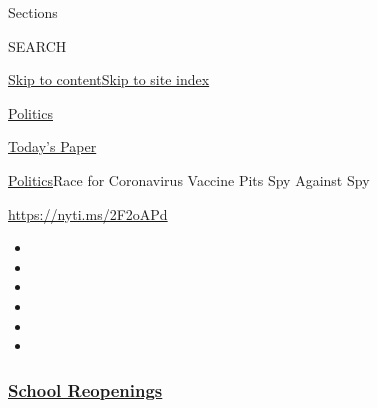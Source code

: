 Sections

SEARCH

\protect\hyperlink{site-content}{Skip to
content}\protect\hyperlink{site-index}{Skip to site index}

\href{https://www.nytimes3xbfgragh.onion/section/politics}{Politics}

\href{https://myaccount.nytimes3xbfgragh.onion/auth/login?response_type=cookie\&client_id=vi}{}

\href{https://www.nytimes3xbfgragh.onion/section/todayspaper}{Today's
Paper}

\href{/section/politics}{Politics}\textbar{}Race for Coronavirus Vaccine
Pits Spy Against Spy

\url{https://nyti.ms/2F2oAPd}

\begin{itemize}
\item
\item
\item
\item
\item
\item
\end{itemize}

\hypertarget{school-reopenings}{%
\subsubsection{\texorpdfstring{\href{https://www.nytimes3xbfgragh.onion/spotlight/schools-reopening?name=styln-coronavirus-schools-reopening\&region=TOP_BANNER\&block=storyline_menu_recirc\&action=click\&pgtype=Article\&impression_id=54ca3e30-efb9-11ea-8c1d-cb4966d29e98\&variant=undefined}{School
Reopenings}}{School Reopenings}}\label{school-reopenings}}

